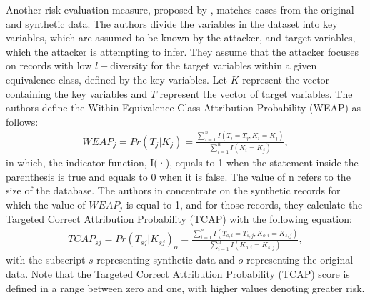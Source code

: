 Another risk evaluation measure, proposed by \citet{taub2018differential}, matches cases from the original and synthetic data. The authors divide the variables in the dataset into key variables, which are assumed to be known by the attacker, and target variables, which the attacker is attempting to infer. They assume that the attacker focuses on records with low $l-$diversity for the target variables within a given equivalence class, defined by the key variables. Let $K$ represent the vector containing the key variables and $T$ represent the vector of target variables. The authors define the Within Equivalence Class Attribution Probability (WEAP) as follows:
\begin{align*}
    WEAP_{j}=Pr(T_{j}|K_j)=\frac{\sum_{i=1}^{n}I(T_i=T_j,K_i=K_j)}{\sum_{i=1}^{n}I(K_i=K_j)},
\end{align*}
in which, the indicator function, I(·), equals to 1 when the statement inside the parenthesis is true and equals to 0 when it is false. The value of n refers to the size of the database. The authors in \citet{taub2018differential} concentrate on the synthetic records for which the value of $WEAP_j$ is equal to 1, and for those records, they calculate the Targeted Correct Attribution Probability (TCAP) with the following equation:
\begin{align*}
    TCAP_{sj}=Pr(T_{sj}|K_{sj})_{o}=\frac{\sum_{i=1}^{n}I(T_{o,i}=T_{s,j},K_{o,i}=K_{s,j})}{\sum_{i=1}^{n}I(K_{o,i}=K_{s,j})},
\end{align*}
with the subscript $s$ representing synthetic data and $o$ representing the original data. Note that the Targeted Correct Attribution Probability (TCAP) score is defined in a range between zero and one, with higher values denoting greater risk.

